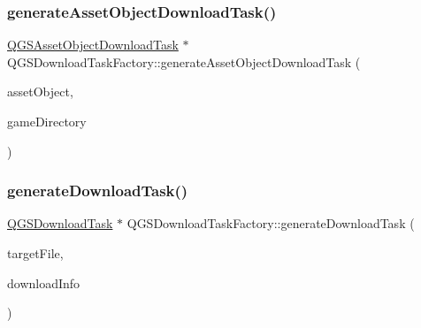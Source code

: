 \subsubsection{\texorpdfstring{generate\+Asset\+Object\+Download\+Task()}{generateAssetObjectDownloadTask()}}
{\footnotesize\ttfamily \mbox{\hyperlink{class_q_g_s_asset_object_download_task}{Q\+G\+S\+Asset\+Object\+Download\+Task}} $\ast$ Q\+G\+S\+Download\+Task\+Factory\+::generate\+Asset\+Object\+Download\+Task (\begin{DoxyParamCaption}\item[{const \mbox{\hyperlink{class_q_g_s_asset_object}{Q\+G\+S\+Asset\+Object}} \&}]{asset\+Object,  }\item[{\mbox{\hyperlink{class_q_g_s_game_directory}{Q\+G\+S\+Game\+Directory}} \&}]{game\+Directory }\end{DoxyParamCaption})}

\mbox{\label{class_q_g_s_download_task_factory_a237d924f9a9bec548cb8154ed8c7bb97}} 
\subsubsection{\texorpdfstring{generate\+Download\+Task()}{generateDownloadTask()}}
{\footnotesize\ttfamily \mbox{\hyperlink{class_q_g_s_download_task}{Q\+G\+S\+Download\+Task}} $\ast$ Q\+G\+S\+Download\+Task\+Factory\+::generate\+Download\+Task (\begin{DoxyParamCaption}\item[{Q\+File $\ast$}]{target\+File,  }\item[{\mbox{\hyperlink{class_q_g_s_download_info}{Q\+G\+S\+Download\+Info}}}]{download\+Info }\end{DoxyParamCaption})}

\mbox{\label{class_q_g_s_download_task_factory_a282bb3cede44407ba5b07c97ef3f6486}} 
